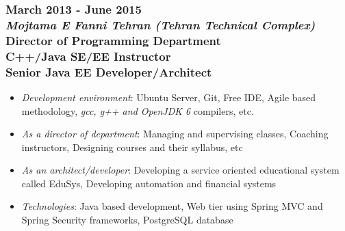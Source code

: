 \documentclass[10pt,a4paper]{article}
\begin{document}
\subsubsection{\textnormal {March 2013 - June 2015} \\ \textnormal {\textit {Mojtama E Fanni Tehran (Tehran Technical Complex)}} \\ Director of Programming Department \\ C++/Java SE/EE Instructor \\ Senior Java EE Developer/Architect}
  \setlength{\leftskip}{0.5cm}
  \setlength{\rightskip}{1cm}
  \begin{itemize}
    \setlength{\rightskip}{1cm}
    \setlength\itemsep{0em}
    \item \small \textit {Development environment}: Ubuntu Server, Git, Free IDE, Agile based methodology, \textit {gcc, g++ and OpenJDK 6} compilers, etc.    
    \item \small \textit {As a director of department}: Managing and supervising classes, Coaching instructors, Designing courses and their syllabus, etc
    \item \small \textit {As an architect/developer}: Developing a service oriented educational system called EduSys, Developing automation and financial systems
    \item \small \textit {Technologies}: Java based development, Web tier using Spring MVC and Spring Security frameworks, PostgreSQL database
  \end{itemize}
  \setlength{\leftskip}{0pt}
  \setlength{\rightskip}{0cm}
	  
\end{document}
